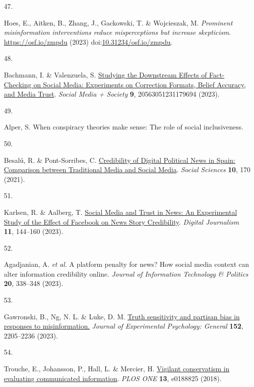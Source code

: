 \documentclass[
  man]{apa6}
\newlength{\cslhangindent}
\newlength{\csllabelwidth}
\newenvironment{CSLReferences}[2] %
 {\begin{list}{}{%
  \setlength{\itemindent}{0pt}
  \setlength{\leftmargin}{0pt}
  \setlength{\parsep}{0pt}
  \ifodd #1
   \setlength{\leftmargin}{\cslhangindent}
   \setlength{\itemindent}{-1\cslhangindent}
  \fi
  \setlength{\itemsep}{#2\baselineskip}}}
 {\end{list}}
\newcommand{\CSLLeftMargin}[1]{\parbox[t]{\csllabelwidth}{\strut#1\strut}}
\newcommand{\CSLRightInline}[1]{\parbox[t]{\linewidth - \csllabelwidth}{\strut#1\strut}}
\begin{document}
\begin{CSLReferences}{0}{0}
\CSLLeftMargin{47. }%
\CSLRightInline{Hoes, E., Aitken, B., Zhang, J., Gackowski, T. \& Wojcieszak, M. \emph{Prominent misinformation interventions reduce misperceptions but increase skepticism}. \url{https://osf.io/zmpdu} (2023) doi:\href{https://doi.org/10.31234/osf.io/zmpdu}{10.31234/osf.io/zmpdu}.}

\CSLLeftMargin{48. }%
\CSLRightInline{Bachmann, I. \& Valenzuela, S. \href{https://doi.org/10.1177/20563051231179694}{Studying the Downstream Effects of Fact-Checking on Social Media: Experiments on Correction Formats, Belief Accuracy, and Media Trust}. \emph{Social Media + Society} \textbf{9}, 20563051231179694 (2023).}

\CSLLeftMargin{49. }%
\CSLRightInline{Alper, S. When conspiracy theories make sense: The role of social inclusiveness.}

\CSLLeftMargin{50. }%
\CSLRightInline{Besalú, R. \& Pont-Sorribes, C. \href{https://doi.org/10.3390/socsci10050170}{Credibility of Digital Political News in Spain: Comparison between Traditional Media and Social Media}. \emph{Social Sciences} \textbf{10}, 170 (2021).}

\CSLLeftMargin{51. }%
\CSLRightInline{Karlsen, R. \& Aalberg, T. \href{https://doi.org/10.1080/21670811.2021.1945938}{Social Media and Trust in News: An Experimental Study of the Effect of Facebook on News Story Credibility}. \emph{Digital Journalism} \textbf{11}, 144--160 (2023).}

\CSLLeftMargin{52. }%
\CSLRightInline{Agadjanian, A. \emph{et al.} A platform penalty for news? How social media context can alter information credibility online. \emph{Journal of Information Technology \& Politics} \textbf{20}, 338--348 (2023).}

\CSLLeftMargin{53. }%
\CSLRightInline{*Gawronski, B., Ng, N. L. \& Luke, D. M. \href{https://doi.org/10.1037/xge0001381}{Truth sensitivity and partisan bias in responses to misinformation.} \emph{Journal of Experimental Psychology: General} \textbf{152}, 2205--2236 (2023).}

\CSLLeftMargin{54. }%
\CSLRightInline{Trouche, E., Johansson, P., Hall, L. \& Mercier, H. \href{https://doi.org/10.1371/journal.pone.0188825}{Vigilant conservatism in evaluating communicated information}. \emph{PLOS ONE} \textbf{13}, e0188825 (2018).}


\end{CSLReferences}
\end{document}
